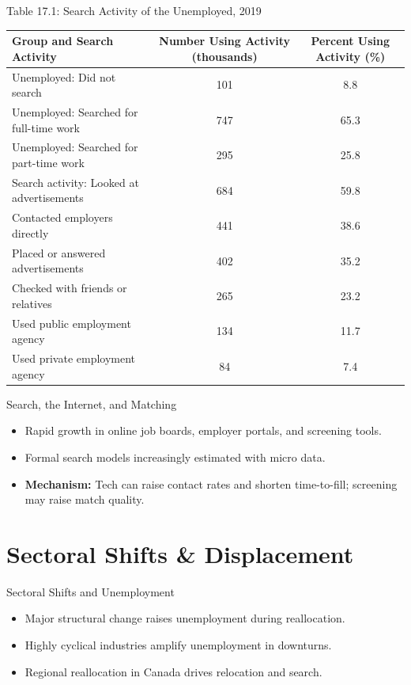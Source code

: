 \documentclass[aspectratio=169]{beamer}
\begin{document}
\begin{frame}{Table 17.1: Search Activity of the Unemployed, 2019}
\transfade
\scriptsize
\begin{tabular}{lcc}
\toprule
\textbf{Group and Search Activity} & \textbf{Number Using Activity (thousands)} & \textbf{Percent Using Activity (\%)} \\
\midrule
Unemployed: Did not search & 101 & 8.8 \\
Unemployed: Searched for full-time work & 747 & 65.3 \\
Unemployed: Searched for part-time work & 295 & 25.8 \\
Search activity: Looked at advertisements & 684 & 59.8 \\
\quad Contacted employers directly & 441 & 38.6 \\
\quad Placed or answered advertisements & 402 & 35.2 \\
\quad Checked with friends or relatives & 265 & 23.2 \\
\quad Used public employment agency & 134 & 11.7 \\
\quad Used private employment agency & 84 & 7.4 \\
\bottomrule
\end{tabular}
\end{frame}

\begin{frame}{Search, the Internet, and Matching}
\transfade
\begin{itemize}[<+->]
  \item Rapid growth in online job boards, employer portals, and screening tools.
  \item Formal search models increasingly estimated with micro data.
  \item \textbf{Mechanism:} Tech can raise contact rates and shorten time-to-fill; screening may raise match quality.
\end{itemize}
\end{frame}

\section{Sectoral Shifts \& Displacement}

\begin{frame}{Sectoral Shifts and Unemployment}
\transfade
\begin{itemize}[<+->]
  \item Major structural change raises unemployment during reallocation.
  \item Highly cyclical industries amplify unemployment in downturns.
  \item Regional reallocation in Canada drives relocation and search.
\end{itemize}
\end{frame}
\end{document}
